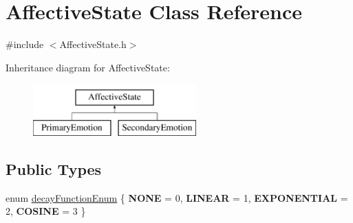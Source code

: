 \hypertarget{class_affective_state}{
\section{\-Affective\-State \-Class \-Reference}
\label{class_affective_state}
}


{\ttfamily \#include $<$\-Affective\-State.\-h$>$}

\-Inheritance diagram for \-Affective\-State\-:\begin{figure}[H]
\begin{center}
\leavevmode
\includegraphics[height=2.000000cm]{class_affective_state}
\end{center}
\end{figure}
\subsection*{\-Public \-Types}
\begin{DoxyCompactItemize}
\item 
enum \hyperlink{class_affective_state_aa47963a65353591a1e2109987ef624a1}{decay\-Function\-Enum} \{ {\bfseries \-N\-O\-N\-E} =  0, 
{\bfseries \-L\-I\-N\-E\-A\-R} =  1, 
{\bfseries \-E\-X\-P\-O\-N\-E\-N\-T\-I\-A\-L} =  2, 
{\bfseries \-C\-O\-S\-I\-N\-E} =  3
 \}
\end{DoxyCompactItemize}
